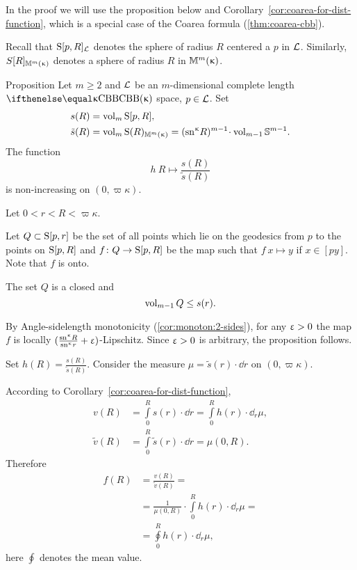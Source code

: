 In the proof we will use the proposition below and 
Corollary~\ref{cor:coarea-for-dist-function},
which is a special case of the Coarea formula (\ref{thm:coarea-cbb}).

Recall that $\mathrm{S}{}[p,R]_{\mathcal{L}}$ denotes the sphere of radius $R$ centered a $p$ in $\mathcal{L}$.
Similarly,  $S[R]_{\mathbb{M}_{{}}^{m}({\upkappa})}$ denotes  a sphere of radius $R$ in ${\mathbb{M}_{{}}^{m}({\upkappa})}$.

\begin{thm}{Proposition}\label{prop:monotonic-spheres}
Let $m\ge 2$ and 
$\mathcal{L}$ be an $m$-dimensional complete length $\Alex\kappa$ space, 
$p\in \spc{L}$.
Set
\begin{align*}
s(R)&=\vol_m\Sphere[p,R],
\\
\tilde s(R)&=\vol_m\Sphere(R)_{\Lob{m}{\kappa}}=(\sn\kappa R)^{m-1}\cdot\vol_{m-1}\mathbb{S}^{m-1}.
\end{align*}
The function 
\[
h\: R\mapsto \frac {s(R)}{\tilde s(R)}
\]
is non-increasing on $(0,\varpi\kappa)$.
\end{thm}

Let $0<r<R<\varpi\kappa$.

Let $Q\subset \Sphere[p,r]$ be the set of all points 
which lie on the geodesics from $p$ to the points on $\mathrm{S}{}[p,R]$
and $f\:Q\to \Sphere[p,R]$ be the map such that $f\:x\mapsto y$ if $x\in [py]$.
Note that $f$ is onto.

The set $Q$ is a closed
and 
\[\vol_{m-1}Q\le s(r).\]

By Angle-sidelength  monotonicity (\ref{cor:monoton:2-sides}), 
for any $\upvarepsilon>0$ the map $f$ is 
locally $(\tfrac{\mathrm{sn}^{\upkappa} R}{\mathrm{sn}^{\upkappa} r}+\upvarepsilon)$-Lipschitz.
Since $\upvarepsilon>0$ is arbitrary, the proposition follows.
\qeds


Set $h(R)= \frac {s(R)}{\tilde s(R)}$.
Consider the measure $\mu=\tilde s(r)\cdot\dd r$ on  $(0,\varpi\kappa)$.

According to Corollary~\ref{cor:coarea-for-dist-function},
\begin{align*}
v(R)&=\int\limits_0^R s(r)\cdot\dd r=\int\limits_0^R h(r)\cdot\dd_r \mu,
\\
\tilde v(R)&=\int\limits_0^R\tilde s(r)\cdot\dd r=\mu(0,R).
\end{align*}
Therefore
\begin{align*}
f(R)&=\frac{v(R)}{\tilde v(R)}=
\\
&=\frac1{\mu(0,R)}\cdot\int\limits_0^R h(r)\cdot\dd_r\mu=
\\
&=\oint\limits_0^R h(r)\cdot\dd_r\mu,
\end{align*}
here $\oint$ denotes the mean value.

